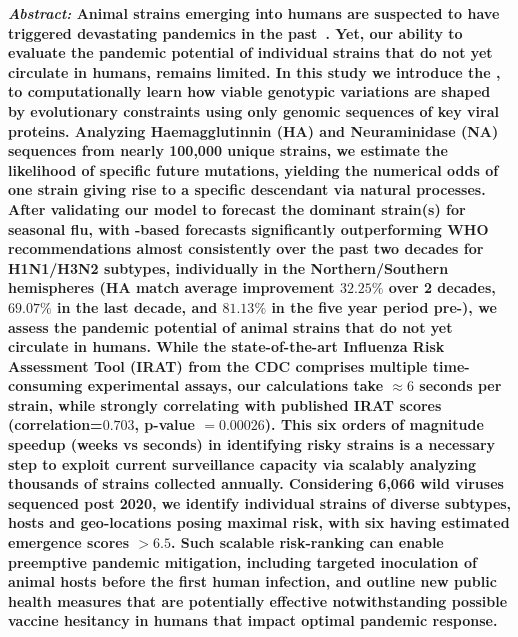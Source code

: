 \documentclass[onecolumn, compsoc,10pt]{IEEEtran}
\begin{document}
  
\maketitle

{\bf \sffamily \fontsize{10}{12}\selectfont \noindent   
  {\normalfont \itshape Abstract:} Animal \infl  strains emerging into humans are suspected to have triggered devastating  pandemics in the past~\cite{shao2017evolution,mills2004transmissibility,reid2003origin,landolt2007up}. Yet, our ability to evaluate the pandemic potential of individual strains that do not yet circulate in humans, remains limited. In this study we introduce the \enet, to computationally learn how viable genotypic variations are shaped by evolutionary constraints using only genomic sequences  of key viral proteins. Analyzing Haemagglutinnin (HA) and Neuraminidase (NA) sequences from nearly 100,000 unique strains, we estimate the likelihood of specific future mutations, yielding the numerical odds of one strain giving rise to a specific descendant via natural processes. After validating our model to forecast the dominant strain(s) for seasonal flu, with \enet-based forecasts significantly outperforming WHO recommendations almost consistently over the past two decades for H1N1/H3N2 subtypes, individually in the Northern/Southern hemispheres (HA match average improvement $32.25\% $ over 2 decades, $69.07\%$ in the last decade, and $81.13\%$ in the five year period pre-\cov), we assess the pandemic potential of animal strains that do not yet circulate in humans. While the state-of-the-art Influenza Risk Assessment Tool (IRAT) from the CDC comprises multiple time-consuming experimental assays, our calculations take $\approx 6$ seconds per strain, while strongly correlating with published IRAT scores (correlation=$0.703$, p-value $= 0.00026$). This six orders of magnitude speedup (weeks vs seconds) in identifying risky strains is a necessary step to exploit  current surveillance capacity via scalably analyzing thousands of strains collected annually. Considering 6,066 wild \infl viruses sequenced post 2020, we identify individual strains of diverse subtypes, hosts and geo-locations posing maximal risk, with six having estimated emergence scores $> 6.5$. Such scalable risk-ranking can enable preemptive pandemic mitigation, including targeted inoculation of animal hosts before the first human infection, and outline new public health measures that are potentially effective notwithstanding possible vaccine hesitancy in humans that impact optimal pandemic response.}
  
\end{document}
